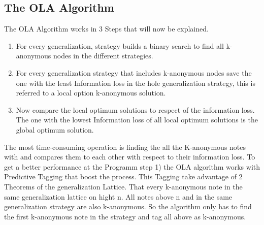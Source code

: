 \documentclass{llncs}
\begin{document}
\subsection{The OLA Algorithm }
The OLA Algorithm works in 3 Steps that will now be explained.
\begin{enumerate}
	\item For every generalization, strategy builds a binary search to find all k-anonymous nodes in the different strategies.
	\item For every generalization strategy that includes k-anonymous nodes save the one with the least Information loss in the hole generalization strategy, this is referred to a local option k-anonymous solution.
	\item Now compare the local optimum solutions to respect of the information loss. The one with the lowest Information loss of all local optimum solutions is the global optimum solution.
\end{enumerate}
The most time-consuming operation is finding the all the K-anonymous notes with and compares them to each other with respect to their information loss.  To get a better performance at the Programm step 1) the OLA algorithm works with Predictive Tagging that boost the process.  This Tagging take advantage of 2 Theorems of the generalization Lattice. That every k-anonymous note in the same generalization lattice on hight n. All notes above n and in the same generalization strategy are also k-anonymous. So the algorithm only has to find the first k-anonymous note in the strategy and tag all above as k-anonymous.   
\end{document}

